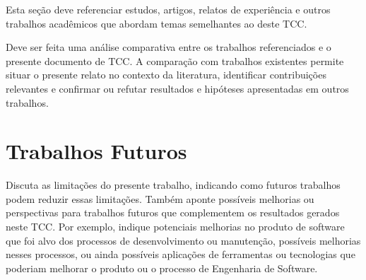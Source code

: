 Esta seção deve referenciar estudos, artigos, relatos de experiência e outros trabalhos acadêmicos que abordam temas semelhantes ao deste TCC. 

Deve ser feita uma análise comparativa entre os trabalhos referenciados e o presente documento de TCC. A comparação com trabalhos existentes permite situar o presente relato no contexto da literatura, identificar contribuições relevantes e confirmar ou refutar resultados e hipóteses apresentadas em outros trabalhos.
 
\section{Trabalhos Futuros}

Discuta as limitações do presente trabalho, indicando como futuros trabalhos podem reduzir essas limitações. Também aponte possíveis melhorias ou perspectivas para trabalhos futuros que complementem os resultados gerados neste TCC. Por exemplo, indique potenciais melhorias no produto de software que foi alvo dos processos de desenvolvimento ou manutenção, possíveis melhorias nesses processos, ou  ainda possíveis aplicações de ferramentas ou tecnologias que poderiam melhorar o produto ou o processo de Engenharia de Software.